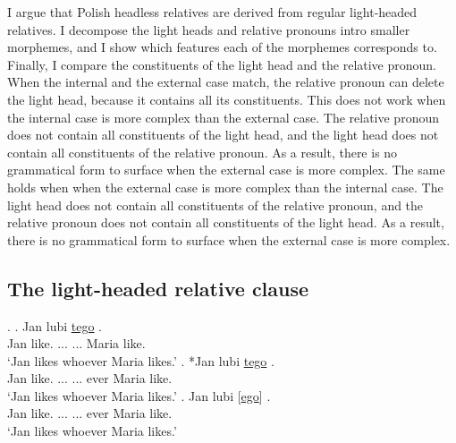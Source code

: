 I argue that Polish headless relatives are derived from regular light-headed relatives.
I decompose the light heads and relative pronouns intro smaller morphemes, and I show which features each of the morphemes corresponds to.
Finally, I compare the constituents of the light head and the relative pronoun.
When the internal and the external case match, the relative pronoun can delete the light head, because it contains all its constituents.
This does not work when the internal case is more complex than the external case. The relative pronoun does not contain all constituents of the light head, and the light head does not contain all constituents of the relative pronoun. As a result, there is no grammatical form to surface when the external case is more complex.
The same holds when when the external case is more complex than the internal case. The light head does not contain all constituents of the relative pronoun, and the relative pronoun does not contain all constituents of the light head. As a result, there is no grammatical form to surface when the external case is more complex.



\subsection{The light-headed relative clause}


\ex.
\ag. Jan lubi \underline{tego} \underline{}  .\\
 Jan like.\scsub{[acc]} ...  ... Maria like.\scsub{[acc]}\\
 `Jan likes whoever Maria likes.' \label{ex:polish-acc-acc-rep}
\bg. *Jan lubi \underline{tego} \underline{}   .\\
 Jan like.\scsub{[acc]} ...  ... ever Maria like.\scsub{[acc]}\\
 `Jan likes whoever Maria likes.' \label{ex:polish-acc-acc-rep}
\bg. Jan lubi [\underline{ego}] \underline{}   .\\
Jan like.\scsub{[acc]} ...  ... ever Maria like.\scsub{[acc]}\\
`Jan likes whoever Maria likes.' \label{ex:polish-acc-acc-rep}

